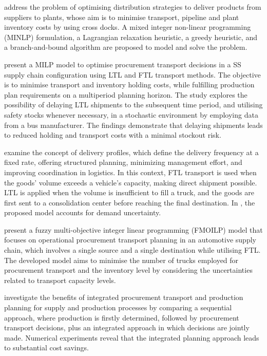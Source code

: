 \autocite{Berman2006InboundCost} address the problem of optimising distribution strategies to deliver products from suppliers to plants, whose aim is to minimise transport, pipeline and plant inventory costs by using cross docks. A mixed integer non-linear programming (MINLP) formulation, a Lagrangian  relaxation heuristic,  a greedy heuristic, and a branch-and-bound algorithm are proposed to model and solve the problem.

\autocite{Sancak2011Multi-itemPolicy} present a MILP model to optimise procurement transport decisions in a SS supply chain configuration using LTL and FTL transport methods. The objective is to minimise transport and inventory holding costs, while fulfilling production plan requirements on a multiperiod planning horizon. The study explores the possibility of delaying LTL shipments to the subsequent time period, and utilising safety stocks whenever necessary, in a stochastic environment by employing data from a bus manufacturer. The findings demonstrate that delaying shipments leads to reduced holding and transport costs with a minimal stockout risk.


\autocite{Schoneberg2010AnNetworks} examine the concept of delivery profiles, which define the delivery frequency at a fixed rate, offering structured planning, minimizing management effort, and improving coordination in logistics. In this context, FTL transport is used when the goods' volume exceeds a vehicle's capacity, making direct shipment possible. LTL is applied when the volume is insufficient to fill a truck, and the goods are first sent to a consolidation center before reaching the final destination. In \autocite{Schoneberg2013ANetworks}, the proposed model accounts for demand uncertainty.

\autocite{Diaz-Madronero2014AChain} present a  fuzzy  multi-objective  integer  linear programming (FMOILP) model that focuses on operational procurement transport planning in an automotive supply chain, which involves a single source and a single destination while utilising FTL. The developed model aims to minimise the number of trucks employed for procurement transport and the inventory level by considering the uncertainties related to transport capacity levels.

\autocite{Hein2016QuantitativeProblem} investigate the benefits of integrated procurement transport and production planning for supply and production processes by comparing a sequential approach, where production is firstly determined, followed by procurement transport decisions, plus an integrated approach in which decisions are jointly made. Numerical experiments reveal that the integrated planning approach leads to substantial cost savings.

